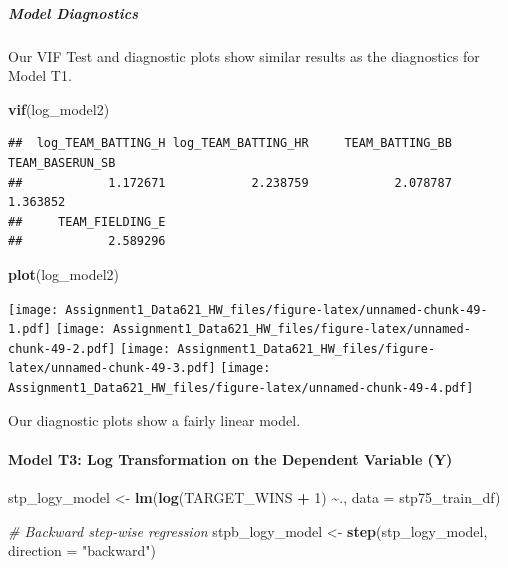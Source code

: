 \documentclass[
]{article}
\newenvironment{Shaded}{\begin{snugshade}}{\end{snugshade}}
\newcommand{\AttributeTok}[1]{\textcolor[rgb]{0.13,0.29,0.53}{#1}}
\newcommand{\CommentTok}[1]{\textcolor[rgb]{0.56,0.35,0.01}{\textit{#1}}}
\newcommand{\DecValTok}[1]{\textcolor[rgb]{0.00,0.00,0.81}{#1}}
\newcommand{\FunctionTok}[1]{\textcolor[rgb]{0.13,0.29,0.53}{\textbf{#1}}}
\newcommand{\NormalTok}[1]{#1}
\newcommand{\OtherTok}[1]{\textcolor[rgb]{0.56,0.35,0.01}{#1}}
\newcommand{\SpecialCharTok}[1]{\textcolor[rgb]{0.81,0.36,0.00}{\textbf{#1}}}
\newcommand{\StringTok}[1]{\textcolor[rgb]{0.31,0.60,0.02}{#1}}
\begin{document}
\subparagraph{Model Diagnostics}\label{model-diagnostics-1}

Our VIF Test and diagnostic plots show similar results as the
diagnostics for Model T1.

\begin{Shaded}
\begin{Highlighting}[]
\FunctionTok{vif}\NormalTok{(log\_model2)}
\end{Highlighting}
\end{Shaded}

\begin{verbatim}
##  log_TEAM_BATTING_H log_TEAM_BATTING_HR     TEAM_BATTING_BB     TEAM_BASERUN_SB 
##            1.172671            2.238759            2.078787            1.363852 
##     TEAM_FIELDING_E 
##            2.589296
\end{verbatim}

\begin{Shaded}
\begin{Highlighting}[]
\FunctionTok{plot}\NormalTok{(log\_model2)}
\end{Highlighting}
\end{Shaded}

\texttt{[image: Assignment1\_Data621\_HW\_files/figure-latex/unnamed-chunk-49-1.pdf]}
\texttt{[image: Assignment1\_Data621\_HW\_files/figure-latex/unnamed-chunk-49-2.pdf]}
\texttt{[image: Assignment1\_Data621\_HW\_files/figure-latex/unnamed-chunk-49-3.pdf]}
\texttt{[image: Assignment1\_Data621\_HW\_files/figure-latex/unnamed-chunk-49-4.pdf]}

Our diagnostic plots show a fairly linear model.

\paragraph{Model T3: Log Transformation on the Dependent Variable
(Y)}\label{model-t3-log-transformation-on-the-dependent-variable-y}

\begin{Shaded}
\begin{Highlighting}[]
\NormalTok{stp\_logy\_model }\OtherTok{\textless{}{-}} \FunctionTok{lm}\NormalTok{(}\FunctionTok{log}\NormalTok{(TARGET\_WINS }\SpecialCharTok{+} \DecValTok{1}\NormalTok{) }\SpecialCharTok{\textasciitilde{}}\NormalTok{., }\AttributeTok{data =}\NormalTok{ stp75\_train\_df)}

\CommentTok{\# Backward step{-}wise regression}
\NormalTok{stpb\_logy\_model }\OtherTok{\textless{}{-}} \FunctionTok{step}\NormalTok{(stp\_logy\_model, }\AttributeTok{direction =} \StringTok{"backward"}\NormalTok{)}
\end{Highlighting}
\end{Shaded}
\end{document}
